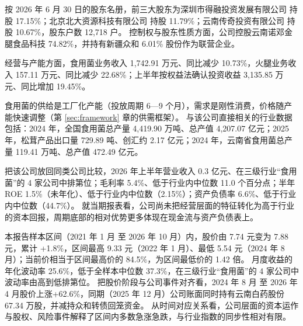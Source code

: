  按 2026 年 6 月 30 日的股东名册，前三大股东为深圳市得融投资发展有限公司 持股 17.15\%；北京北大资源科技有限公司 持股 11.79\%；云南传奇投资有限公司 持股 10.67\%，股东户数 12,718 户。 控制权与股东性质方面，公司控股云南诺邓金腿食品科技 74.82\%，并持有新疆众和 6.01\% 股份作为联营企业。

 经营与产能方面，食用菌业务收入 1,742.91 万元、同比减少 10.73\%，火腿业务收入 157.11 万元、同比减少 22.68\%；上半年按权益法确认投资收益 3,135.85 万元、同比增加 19.45\%。

 食用菌的供给是工厂化产能（投放周期 6---9 个月），需求是刚性消费，价格随产能快速调整（第 \ref{sec:framework} 章的供需框架）。 与该公司直接相关的行业数据包括：2024 年，全国食用菌总产量 4,419.90 万吨、总产值 4,207.07 亿元；2025 年，松茸产品出口量 729.89 吨、创汇约 2.17 亿元；2024 年，云南省食用菌总产量 119.41 万吨、总产值 472.49 亿元。

 把该公司放回同类公司比较，2026 年上半年营业收入 0.3 亿元、在三级行业“食用菌”的 4 家公司中排第位；毛利率 5.4\%、低于行业内中位数 11.0 个百分点；半年 ROE 1.5\%（未年化）、低于行业内中位数（2.15\%）；资产负债率 6.6\%、低于行业内中位数（44.7\%）。 就当期报表看，公司尚未把经营层面的特征转化为高于行业的资本回报，周期底部的相对优势更多体现在现金流与资产负债表上。

 本报告样本区间（2021 年 1 月 至 2026 年 10 月）内，股价由 7.74 元变为 7.88 元，累计 +1.8\%，区间最高 9.33 元（2022 年 1 月）、最低 5.54 元（2024 年 8 月）；当前价相当于区间最高价的 84.5\%，为区间最低价的 1.42 倍。 月度收益的年化波动率 25.6\%，低于全样本中位数 37.3\%，在三级行业“食用菌”的 4 家公司中波动率由高到低排第位。 把股价阶段与公司事件对齐看，2024 年 8 月 至 2026 年 4 月股价上涨+62.6\%，同期（2025 年 12 月）公司账面同时持有云南白药股份 67.34 万股，并减持众和转债回笼资金。 从时间对应关系看，公司层面的资本运作与股权、风险事件解释了区间内多数急涨急跌，与行业指数的同步性相对有限。

